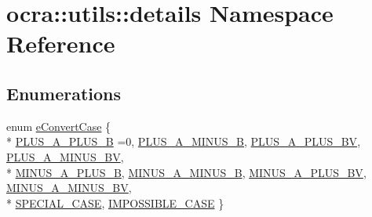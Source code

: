 \hypertarget{namespaceocra_1_1utils_1_1details}{}\section{ocra\+:\+:utils\+:\+:details Namespace Reference}
\label{namespaceocra_1_1utils_1_1details}
\subsection*{Enumerations}
\begin{DoxyCompactItemize}
\item 
enum \hyperlink{namespaceocra_1_1utils_1_1details_a617d399055aa54cfdf2d3199ca91c399}{e\+Convert\+Case} \{ \\*
\hyperlink{namespaceocra_1_1utils_1_1details_a617d399055aa54cfdf2d3199ca91c399a03eb35928d61fd2a957cf41c6c4578ca}{P\+L\+U\+S\+\_\+\+A\+\_\+\+P\+L\+U\+S\+\_\+B} =0, 
\hyperlink{namespaceocra_1_1utils_1_1details_a617d399055aa54cfdf2d3199ca91c399a4d0375804693ed7a4e1ff4e40b1d067b}{P\+L\+U\+S\+\_\+\+A\+\_\+\+M\+I\+N\+U\+S\+\_\+B}, 
\hyperlink{namespaceocra_1_1utils_1_1details_a617d399055aa54cfdf2d3199ca91c399a5c4183c0fd47b8c64276843dda690de7}{P\+L\+U\+S\+\_\+\+A\+\_\+\+P\+L\+U\+S\+\_\+\+BV}, 
\hyperlink{namespaceocra_1_1utils_1_1details_a617d399055aa54cfdf2d3199ca91c399a78c37c659e4056c97d766ab9621e01ff}{P\+L\+U\+S\+\_\+\+A\+\_\+\+M\+I\+N\+U\+S\+\_\+\+BV}, 
\\*
\hyperlink{namespaceocra_1_1utils_1_1details_a617d399055aa54cfdf2d3199ca91c399aa51f84eadd7c02e17fcae444cd646c79}{M\+I\+N\+U\+S\+\_\+\+A\+\_\+\+P\+L\+U\+S\+\_\+B}, 
\hyperlink{namespaceocra_1_1utils_1_1details_a617d399055aa54cfdf2d3199ca91c399afb7decc69a9b25a7b762f2084e9d52f0}{M\+I\+N\+U\+S\+\_\+\+A\+\_\+\+M\+I\+N\+U\+S\+\_\+B}, 
\hyperlink{namespaceocra_1_1utils_1_1details_a617d399055aa54cfdf2d3199ca91c399a6de905f897737b898a7c188c7d9c85b8}{M\+I\+N\+U\+S\+\_\+\+A\+\_\+\+P\+L\+U\+S\+\_\+\+BV}, 
\hyperlink{namespaceocra_1_1utils_1_1details_a617d399055aa54cfdf2d3199ca91c399a10d452d5d1cdb90b7216e1e49ad73b8e}{M\+I\+N\+U\+S\+\_\+\+A\+\_\+\+M\+I\+N\+U\+S\+\_\+\+BV}, 
\\*
\hyperlink{namespaceocra_1_1utils_1_1details_a617d399055aa54cfdf2d3199ca91c399ac32fdefb96f856fd13bfad381529309e}{S\+P\+E\+C\+I\+A\+L\+\_\+\+C\+A\+SE}, 
\hyperlink{namespaceocra_1_1utils_1_1details_a617d399055aa54cfdf2d3199ca91c399acaa13d6c21f24f969be8e5e53329d178}{I\+M\+P\+O\+S\+S\+I\+B\+L\+E\+\_\+\+C\+A\+SE}
 \}
\end{DoxyCompactItemize}
